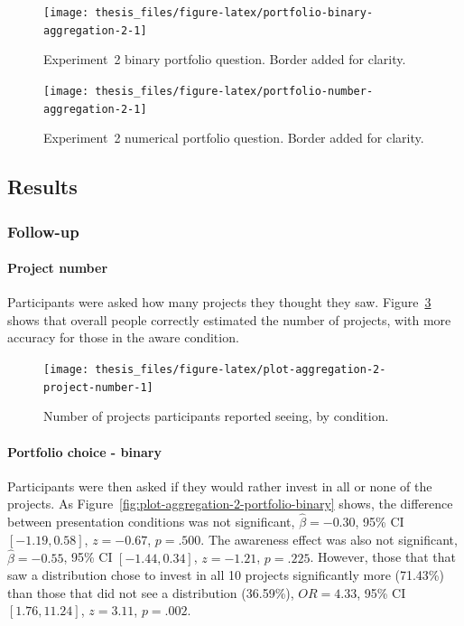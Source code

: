 \documentclass[a4paper, nobind, dvipsnames]{templates/ociamthesis}
\theoremstyle{definition}
\theoremstyle{definition}
\theoremstyle{definition}
\theoremstyle{definition}
\theoremstyle{remark}
\begin{document}
\begin{figure}
\texttt{[image: thesis\_files/figure-latex/portfolio-binary-aggregation-2-1]} \caption{Experiment~2 binary portfolio question. Border added for clarity.}\label{fig:portfolio-binary-aggregation-2}
\end{figure}



\begin{figure}
\texttt{[image: thesis\_files/figure-latex/portfolio-number-aggregation-2-1]} \caption{Experiment~2 numerical portfolio question. Border added for clarity.}\label{fig:portfolio-number-aggregation-2}
\end{figure}

\hypertarget{results-aggregation-2-appendix}{%
\subsection{Results}\label{results-aggregation-2-appendix}}

\subsubsection{Follow-up}

\paragraph{Project number}

Participants were asked how many projects they thought they saw.
Figure~\ref{fig:plot-aggregation-2-project-number} shows that overall people
correctly estimated the number of projects, with more accuracy for those in the
aware condition.



\begin{figure}
\texttt{[image: thesis\_files/figure-latex/plot-aggregation-2-project-number-1]} \caption{Number of projects participants reported seeing, by condition.}\label{fig:plot-aggregation-2-project-number}
\end{figure}

\paragraph{Portfolio choice - binary}

Participants were then asked if they would rather invest in all or none of the
projects. As Figure~\ref{fig:plot-aggregation-2-portfolio-binary} shows, the
difference between presentation conditions was not significant,
\(\hat{\beta} = -0.30\), 95\% CI \([-1.19, 0.58]\), \(z = -0.67\), \(p = .500\). The
awareness effect was also not significant,
\(\hat{\beta} = -0.55\), 95\% CI \([-1.44, 0.34]\), \(z = -1.21\), \(p = .225\). However,
those that that saw a distribution chose to invest in all 10 projects
significantly more
(71.43\%) than
those that did not see a distribution
(36.59\%),
\(OR = 4.33\), 95\% CI \([1.76, 11.24]\), \(z = 3.11\), \(p = .002\).
\end{document}
